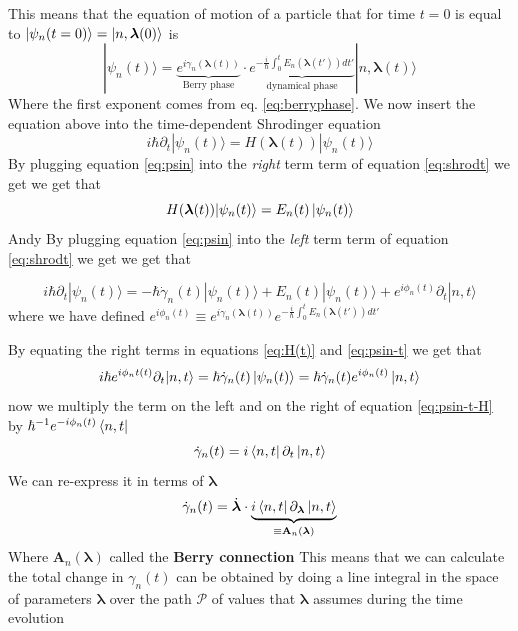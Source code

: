     This means that the equation of motion of a particle that for time $t=0$ is equal to $\ket{\psi_n(t=0)}=\ket{n,\boldsymbol \lambda(0)}$ is 
    \begin{equation}
        \label{eq:psin}
        |\psi_n(t)\rangle=\underbrace{e^{i\gamma_n(\boldsymbol \lambda (t))}}_{\textrm{Berry phase}}\cdot
        \underbrace{e^{-\frac i\hbar\int_0^t E_n(\boldsymbol \lambda (t')) dt'}}_\textrm{dynamical phase}|n,\boldsymbol \lambda (t)\rangle      
    \end{equation}
    Where the first exponent comes from eq. \ref{eq:berryphase}. We now insert the equation above into the time-dependent Shrodinger equation
    \begin{equation}
        \label{eq:shrodt}
        i\hbar\partial_t|\psi_n(t)\rangle=H(\boldsymbol \lambda(t)) |\psi_n(t)\rangle
    \end{equation}
    By plugging equation \ref{eq:psin} into the \textit{right} term term of equation \ref{eq:shrodt} we get we get that
    \begin{equation}
        \label{eq:H(t)}
        H(\boldsymbol \lambda(t)) |\psi_n(t)\rangle = E_n(t)\ket{\psi_n(t)}
    \end{equation}
    Andy By plugging equation \ref{eq:psin} into the \textit{left} term term of equation \ref{eq:shrodt} we get we get that

    \begin{equation}
        \label{eq:psin-t}
        i\hbar\partial_t|\psi_n(t)\rangle=
        -\hbar \dot \gamma_n(t)|\psi_n(t)\rangle + E_n(t)|\psi_n(t)\rangle + e^{i\phi_n(t)}\partial_t|n,t\rangle
    \end{equation}
    where we have defined $e^{i\phi_n(t)} \equiv e^{i\gamma_n(\boldsymbol \lambda (t))}e^{-\frac i\hbar\int_0^t E_n(\boldsymbol \lambda (t')) dt'}$

    By equating the right terms in equations \ref{eq:H(t)} and \ref{eq:psin-t} we get that 
    \begin{equation}
        \label{eq:psin-t-H}
            i\hbar e^{i\phi_nt(t)}\partial_t|n,t\rangle=\hbar\dot \gamma_n(t)\ket{\psi_n(t)} =\hbar\dot \gamma_n(t)e^{i\phi_n(t)}\ket{n,t}
    \end{equation}    
    now we multiply the term on the left and on the right of equation \ref{eq:psin-t-H} by $\hbar^{-1}e^{-i\phi_n(t)} \bra{n,t}$
    \begin{equation}
        \label{eq:psin-t-H-bra}
            \dot \gamma_n(t)=i\bra{n,t} \partial_t\ket{n,t}
    \end{equation}
    We can re-express it in terms of $\boldsymbol \lambda$
    \begin{equation}
        \label{eq:connection}
            \dot \gamma_n(t)=\dot{\boldsymbol \lambda}\cdot\underbrace{i\bra{n,t} \partial_{\boldsymbol \lambda}\ket{n,t}}_{\equiv \mathbf A_n(\boldsymbol \lambda)}
    \end{equation}
    Where $\mathbf A_n(\boldsymbol \lambda)$ called the \textbf{Berry connection}
    This means that we can calculate the total change in $\gamma_n(t)$ can be obtained by doing a line integral in the space of parameters $\boldsymbol \lambda$ over the path $\mathcal P$ of values that $\boldsymbol \lambda$ assumes during the time evolution

